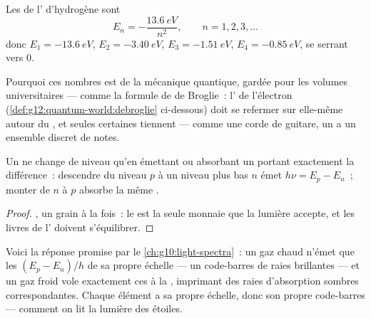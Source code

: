 \begin{proposition}\label{prop:g12:quantum-world:hydrogen}
Les  de l'
d'hydrogène sont
\[
E_n = -\frac{\qty{13.6}{eV}}{n^2}, \qquad n = 1, 2, 3, \dots
\]
donc $E_1 = \qty{-13.6}{eV}$, $E_2 = \qty{-3.40}{eV}$, $E_3 =
\qty{-1.51}{eV}$, $E_4 = \qty{-0.85}{eV}$, se serrant vers $0$.
\end{proposition}
\admitted

\begin{remark}\label{rem:g12:quantum-world:ladder-origin}
Pourquoi ces nombres est de la mécanique quantique, gardée pour les
volumes universitaires --- comme la formule de de Broglie~:
l' de l'électron
(\cref{def:g12:quantum-world:debroglie} ci-dessous) doit se refermer sur
elle-même autour du , et seules
certaines  tiennent --- comme une
corde de guitare, un  a un ensemble
discret de notes.
\end{remark}

\begin{theorem}\label{thm:g12:quantum-world:transition}
Un  ne change de niveau qu'en émettant
ou absorbant un  portant exactement la
différence~: descendre du niveau $p$ à un niveau plus bas $n$ émet
$h\nu = E_p - E_n$~; monter de $n$ à $p$ absorbe la même
.
\end{theorem}

\begin{proof}
, un grain à la fois~: le
 est la seule monnaie que la lumière accepte, et
les livres de l' doivent s'équilibrer.
\end{proof}

\begin{remark}\label{rem:g12:quantum-world:lines}
Voici la réponse promise par le \cref{ch:g10:light-spectra}~: un gaz
chaud n'émet que les  $(E_p - E_n)/h$ de sa propre échelle
--- un code-barres de raies brillantes --- et un gaz froid vole
exactement ces  à la ,
imprimant des raies d'absorption sombres correspondantes. Chaque
élément a sa propre échelle, donc son propre code-barres --- comment
on lit la lumière des étoiles.
\end{remark}

